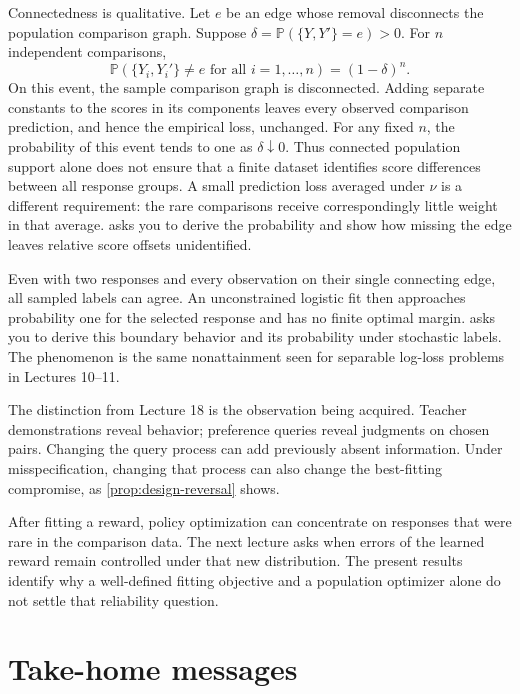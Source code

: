 \documentclass[11pt,twoside]{article}
\renewcommand{\P}{\mathbb P}
\theoremstyle{definition}
\theoremstyle{remark}
\begin{document}
Connectedness is qualitative. Let $e$ be an edge whose removal disconnects
the population comparison graph. Suppose
$\delta=\P(\{Y,Y'\}=e)>0$. For $n$ independent comparisons,
\begin{equation}
 \P\!\left(\{Y_i,Y_i'\}\ne e\text{ for all }i=1,\ldots,n\right)
 =(1-\delta)^n.
 \label{eq:rare-edge}
\end{equation}
On this event, the sample comparison graph is disconnected. Adding separate
constants to the scores in its components leaves every observed comparison
prediction, and hence the empirical loss, unchanged. For any fixed $n$,
the probability of this event tends to one as $\delta\downarrow0$.
Thus connected population support alone does not ensure that a finite
dataset identifies score differences between all response groups. A small
prediction loss averaged under $\nu$ is a different requirement: the
rare comparisons receive correspondingly little weight in that average.
 asks you to derive the probability and
show how missing the edge leaves relative score offsets unidentified.

Even with two responses and every observation on their single connecting
edge, all sampled labels can agree. An unconstrained logistic fit then
approaches probability one for the selected response and has no finite
optimal margin.  asks you to derive
this boundary behavior and its probability under stochastic labels.
The phenomenon is the same nonattainment seen for separable log-loss
problems in Lectures 10--11.

The distinction from Lecture 18 is the observation being acquired.
Teacher demonstrations reveal behavior; preference queries reveal judgments
on chosen pairs. Changing the query process can add previously absent
information. Under misspecification, changing that process can also change
the best-fitting compromise, as \cref{prop:design-reversal} shows.

After fitting a reward, policy optimization can concentrate on responses
that were rare in the comparison data. The next lecture asks when errors
of the learned reward remain controlled under that new distribution.
The present results identify why a well-defined fitting objective and a
population optimizer alone do not settle that reliability question.

\section{Take-home messages}
\label{sec:take-home}
\end{document}
